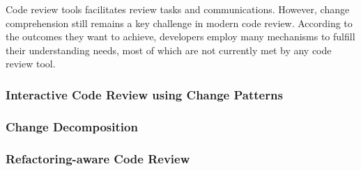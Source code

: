 \documentclass[runningheads,a4paper]{llncs}
\begin{document}
Code review tools facilitates review tasks and communications. However, change comprehension still remains a key challenge in modern code review. According to the outcomes they want to achieve, developers employ many mechanisms to fulfill their understanding needs, most of which are not currently met by any code review tool.

\subsubsection{Interactive Code Review using Change Patterns}

\subsubsection{Change Decomposition}

\subsubsection{Refactoring-aware Code Review}
\end{document}
